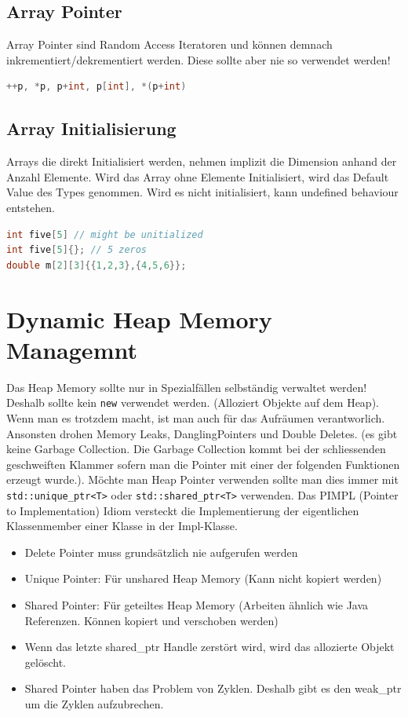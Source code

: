 \subsection{Array Pointer}
Array Pointer sind Random Access Iteratoren und können demnach inkrementiert/dekrementiert werden. Diese sollte aber nie so verwendet werden!
\begin{lstlisting}[language=C++]
++p, *p, p+int, p[int], *(p+int)
\end{lstlisting}

\subsection{Array Initialisierung}
Arrays die direkt Initialisiert werden, nehmen implizit die Dimension anhand der Anzahl Elemente. Wird das Array ohne Elemente Initialisiert, wird das Default Value des Types genommen. Wird es nicht initialisiert, kann undefined behaviour entstehen.
\begin{lstlisting}[language=C++, caption=Initializing an Array] 
int five[5] // might be unitialized
int five[5]{}; // 5 zeros
double m[2][3]{{1,2,3},{4,5,6}};
\end{lstlisting}

\section{Dynamic Heap Memory Managemnt}
Das Heap Memory sollte nur in Spezialfällen selbständig verwaltet werden! Deshalb sollte kein \lstinline|new| verwendet werden. (Alloziert Objekte auf dem Heap). Wenn man es trotzdem macht, ist man auch für das Aufräumen verantworlich. Ansonsten drohen Memory Leaks, DanglingPointers und Double Deletes. (es gibt keine Garbage Collection. Die Garbage Collection kommt bei der schliessenden geschweiften Klammer sofern man die Pointer mit einer der folgenden Funktionen erzeugt wurde.). Möchte man Heap Pointer verwenden sollte man dies immer mit \lstinline|std::unique_ptr<T>| oder \lstinline|std::shared_ptr<T>| verwenden. Das PIMPL (Pointer to Implementation) Idiom versteckt die Implementierung der eigentlichen Klassenmember einer Klasse in der Impl-Klasse.
\begin{itemize}
	\item Delete Pointer muss grundsätzlich nie aufgerufen werden
	\item Unique Pointer: Für unshared Heap Memory (Kann nicht kopiert werden)
	\item Shared Pointer: Für geteiltes Heap Memory (Arbeiten ähnlich wie Java Referenzen. Können kopiert und verschoben werden)
	\item Wenn das letzte shared\_ptr Handle zerstört wird, wird das allozierte Objekt gelöscht.
	\item Shared Pointer haben das Problem von Zyklen. Deshalb gibt es den weak\_ptr um die Zyklen aufzubrechen.
\end{itemize}


